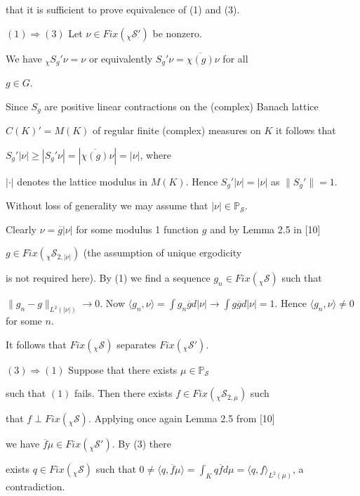 \documentclass{amsart}
\theoremstyle{definition}
\theoremstyle{remark}
\numberwithin{equation}{section}
\begin{document}
that it is sufficient to prove equivalence of (1) and (3).



$(1) \Rightarrow (3)$ Let $\nu \in Fix(_{\chi}\mathcal{S}')$ be nonzero.

We have  $_{\chi}S_g'\nu = \nu $ or equivalently $S_g'\nu = \overline{\chi (g)}\nu$ for all

$g\in G$.

Since $S_g$ are positive linear contractions on the (complex) Banach lattice

$C(K)' = M(K)$ of regular finite (complex) measures on $K$ it follows that

$S_g'|\nu | \geq |S_g'\nu | = |\overline{\chi(g)}\nu | = |\nu |$, where

$|\cdot |$ denotes the lattice modulus in $M(K)$. Hence $S_g'|\nu | = |\nu |$ as $\| S_g' \| = 1$.

Without loss of generality we may assume that $|\nu | \in \mathbb{P}_{\mathcal{S}}$.

Clearly $\nu = \overline{g}|\nu |$ for some modulus 1 function $g$ and by Lemma 2.5 in [10]

$g\in Fix(_{\chi}\mathcal{S}_{2,|\nu |})$ (the assumption of unique ergodicity

is not required here). By (1) we find a sequence $g_n \in Fix(_{\chi}\mathcal{S})$ such that

$\| g_n - g \|_{L^2(| \nu |)} \to 0$. Now $\langle g_n , \nu \rangle  = \int g_n\overline{g}d|\nu |

\to \int g\overline{g}d|\nu | = 1$. Hence $ \langle g_n , \nu \rangle  \neq 0$ for some $n$.

It follows that  $Fix(\mathcal{_{\chi}S})$ separates $Fix(_{\chi}\mathcal{S}')$.



$(3) \Rightarrow (1)$ Suppose that there exists $\mu \in \mathbb{P}_{\mathcal{S}}$

such that $(1)$ fails. Then there exists $f\in Fix(_{\chi}\mathcal{S}_{2,\mu })$ such

that $f \perp Fix(_{\chi}\mathcal{S})$. Applying once again Lemma 2.5 from [10]

we have $\overline{f}\mu \in Fix(_{\chi}\mathcal{S}')$. By (3) there

exists $q \in Fix(_{\chi}\mathcal{S})$ such that $0 \neq \langle q, \overline{f}\mu \rangle

 = \int_K q\overline{f}d\mu = \langle q , f \rangle_{L^2(\mu)}$, a contradiction.
\end{document}

